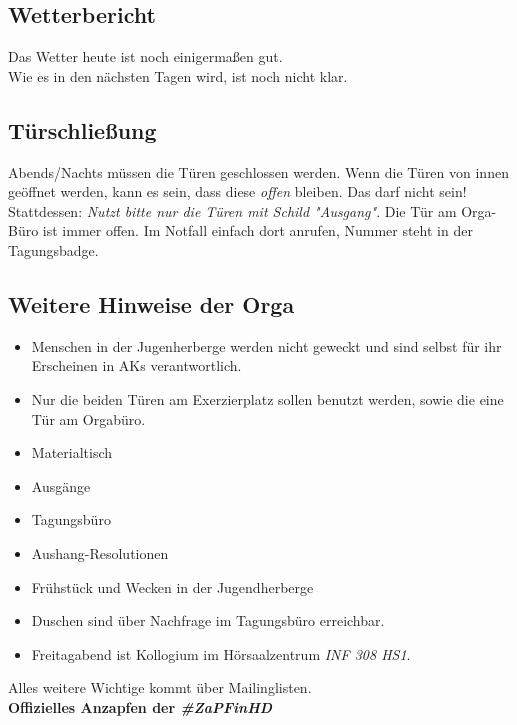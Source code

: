   \subsection*{Wetterbericht}
      Das Wetter heute ist noch einigermaßen gut. \\
      Wie es in den nächsten Tagen wird, ist noch nicht klar.

  \subsection*{Türschließung}
    Abends/Nachts müssen die Türen geschlossen werden.
    Wenn die Türen von innen geöffnet werden, kann es sein, dass diese \textit{offen} bleiben. Das darf nicht sein! \\
    Stattdessen: \textit{Nutzt bitte nur die Türen mit Schild "Ausgang"}. Die Tür am Orga-Büro ist immer offen. Im Notfall einfach dort anrufen, Nummer steht in der Tagungsbadge.

  \subsection*{Weitere Hinweise der Orga}
    \begin{itemize}
      \item Menschen in der Jugenherberge werden nicht geweckt und sind selbst für ihr Erscheinen in AKs verantwortlich.
      \item Nur die beiden Türen am Exerzierplatz sollen benutzt werden, sowie die eine Tür am Orgabüro.
      \item Materialtisch
      \item Ausgänge
      \item Tagungsbüro
      \item Aushang-Resolutionen
      \item Frühstück und Wecken in der Jugendherberge
      \item Duschen sind über Nachfrage im Tagungsbüro erreichbar.
      \item Freitagabend ist Kollogium im Hörsaalzentrum \textit{INF 308 HS1}.
    \end{itemize}

  Alles weitere Wichtige kommt über Mailinglisten. \\

  \textbf{Offizielles Anzapfen der \mbox{\textit{\#ZaPFinHD}}}


